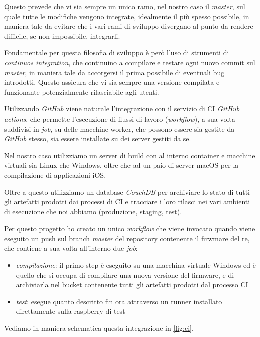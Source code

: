 \documentclass[12pt,a4paper,twoside,titlepage]{book}
\begin{document}
Questo prevede che vi sia sempre un unico ramo, nel nostro caso il \textit{master}, sul 
quale tutte le modifiche vengono integrate, idealmente il più spesso possibile, in 
maniera tale da evitare che i vari rami di sviluppo divergano al punto da rendere difficile,
se non impossibile, integrarli.

Fondamentale per questa filosofia di sviluppo è però l'uso di strumenti di \textit{continuos integration},
che continuino a compilare e testare ogni nuovo commit sul \textit{master}, in maniera 
tale da accorgersi il prima possibile di eventuali bug introdotti. Questo assicura che 
vi sia sempre una versione compilata e funzionante potenzialmente rilasciabile agli utenti. 

Utilizzando \textit{GitHub} viene naturale l'integrazione con il servizio di CI 
\textit{GitHub actions}, che permette l'esecuzione di flussi di lavoro (\textit{workflow}), 
a sua volta suddivisi in \textit{job}, su delle macchine worker, che possono essere sia 
gestite da \textit{GitHub} stesso, sia essere installate su dei server gestiti da se. 

Nel nostro caso utilizziamo un server di build con al interno container e macchine virtuali 
sia Linux che Windows, oltre che ad un paio di server macOS per la compilazione di applicazioni 
iOS. 

Oltre a questo utilizziamo un database \textit{CouchDB} per archiviare lo stato di tutti 
gli artefatti prodotti dai processi di CI e tracciare i loro rilasci nei vari ambienti di 
esecuzione che noi abbiamo (produzione, staging, test). 

Per questo progetto ho creato un unico \textit{workflow} che viene invocato quando viene eseguito 
un push sul branch \textit{master} del repository contenente il firwmare del \Gls{re}, 
che contiene a sua volta all'interno due \textit{job}:
\begin{itemize}
    \item \textit{compilazione}: il primo step è eseguito su una macchina virtuale Windows 
        ed è quello che si occupa di compilare una nuova versione del \gls{firmware}, e di archiviarla
        nel bucket contenente tutti gli artefatti prodotti dal processo CI
    \item \textit{test}: esegue quanto descritto fin ora attraverso un runner installato 
        direttamente sulla raspberry di test 
\end{itemize}

Vediamo in maniera schematica questa integrazione in \autoref{fig:ci}. 
\end{document}
